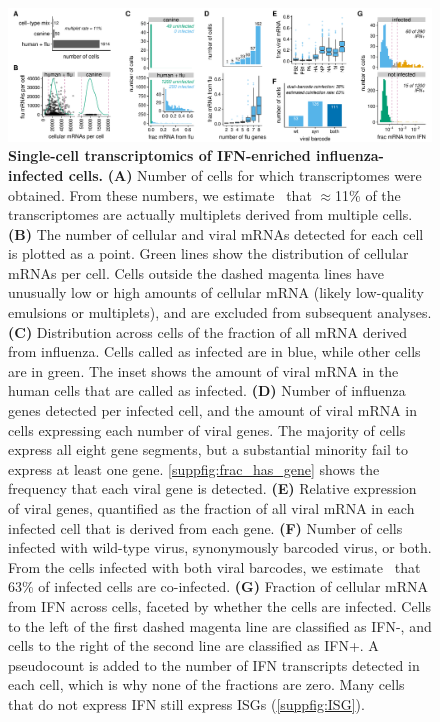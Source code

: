 \documentclass[10pt,letterpaper]{article}
\newenvironment{fullwidth}{%
  \begin{adjustwidth}{-2.3in}{}
}{\end{adjustwidth}}
\newcommand{\SUPPFIG}[1]{\autoref{suppfig:#1}}
\begin{document}
\begin{figure}
\begin{fullwidth}

\includegraphics[width=\linewidth, clip=false]{figures/single_cell_figures/p_cell_summary.pdf}

\caption{
{\bf Single-cell transcriptomics of IFN-enriched influenza-infected cells.}
{\bf (A)} 
Number of cells for which transcriptomes were obtained.
From these numbers, we estimate~\cite{bloom2018estimating} that $\approx$11\% of the transcriptomes are actually multiplets derived from multiple cells. 
{\bf (B)} The number of cellular and viral mRNAs detected for each cell is plotted as a point.
Green lines show the distribution of cellular mRNAs per cell.
Cells outside the dashed magenta lines have unusually low or high amounts of cellular mRNA (likely low-quality emulsions or multiplets), and are excluded from subsequent analyses.
{\bf (C)} Distribution across cells of the fraction of all mRNA derived from influenza.
Cells called as infected are in blue, while other cells are in green.
The inset shows the amount of viral mRNA in the human cells that are called as infected.
{\bf (D)} Number of influenza genes detected per infected cell, and the amount of viral mRNA in cells expressing each number of viral genes.
The majority of cells express all eight gene segments, but a substantial minority fail to express at least one gene.
\SUPPFIG{frac_has_gene} shows the frequency that each viral gene is detected.
{\bf (E)} Relative expression of viral genes, quantified as the fraction of all viral mRNA in each infected cell that is derived from each gene.
{\bf (F)} Number of cells infected with wild-type virus, synonymously barcoded virus, or both.
From the cells infected with both viral barcodes, we estimate~\cite{bloom2018estimating} that 63\% of infected cells are co-infected.
{\bf (G)} Fraction of cellular mRNA from IFN across cells, faceted by whether the cells are infected.
Cells to the left of the first dashed magenta line are classified as IFN-, and cells to the right of the second line are classified as IFN+.
A pseudocount is added to the number of IFN transcripts detected in each cell, which is why none of the fractions are zero.
Many cells that do not express IFN still express ISGs (\SUPPFIG{ISG}).
}
\label{fig:transcriptomics}

\end{fullwidth}
\end{figure}
\end{document}
